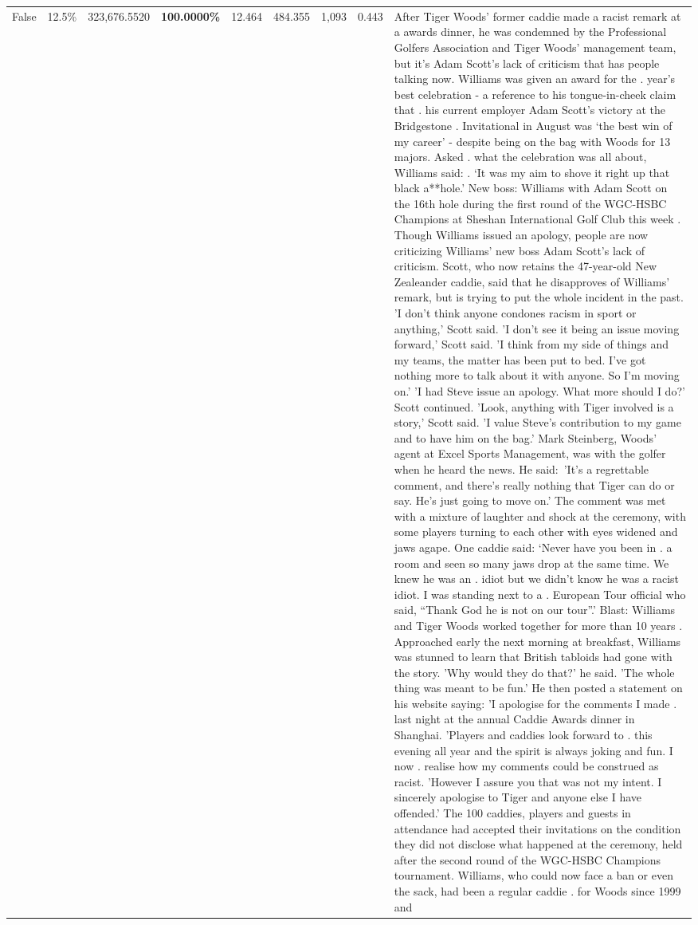 \begin{table}[H]
\begin{tabular}{lllrlllll}
False & 12.5\% & 323,676.5520 & \bfseries \color{red} 100.0000\% & 12.464 & 484.355 & 1,093 & 0.443 & After Tiger Woods' former caddie made a racist remark at a awards dinner, he was condemned by the Professional Golfers Association and Tiger Woods' management team, but it's Adam Scott's lack of criticism that has people talking now. Williams was given an award for the . year’s best celebration - a reference to his tongue-in-cheek claim that . his current employer Adam Scott’s victory at the Bridgestone . Invitational in August was ‘the best win of my career’ - despite being on the bag with Woods for 13 majors. Asked . what the celebration was all about, Williams said: . ‘It was my aim to shove it right up that black a**hole.’ New boss: Williams with Adam Scott  on the 16th hole during the first round of the WGC-HSBC Champions at Sheshan International Golf Club this week . Though Williams issued an apology, people are now criticizing Williams' new boss Adam Scott's lack of criticism. Scott, who now retains the 47-year-old New Zealeander caddie, said that he disapproves of Williams' remark, but is trying to put the whole incident in the past. 'I don't think anyone condones racism in sport or anything,' Scott said. 'I don't see it being an issue moving forward,' Scott said. 'I think from my side of things and my teams, the matter has been put to bed. I've got nothing more to talk about it with anyone. So I'm moving on.' 'I had Steve issue an apology. What more should I do?' Scott continued. 'Look, anything with Tiger involved is a story,' Scott said. 'I value Steve's contribution to my game and to have him on the bag.' Mark Steinberg, Woods' agent at Excel Sports Management, was with the golfer when he heard the news. He said: 'It's a regrettable comment, and there's really nothing that Tiger can do or say. He's just going to move on.' The comment was met with a mixture of laughter and shock at the ceremony, with some players turning to each other with eyes widened and jaws agape. One caddie said: ‘Never have you been in . a room and seen so many jaws drop at the same time. We knew he was an . idiot but we didn’t know he was a racist idiot. I was standing next to a . European Tour official who said, “Thank God he is not on our tour”.’ Blast: Williams and Tiger Woods worked together for more than 10 years . Approached early the next morning at breakfast, Williams was stunned to learn that British tabloids had gone with the story. 'Why would they do that?' he said. 'The whole thing was meant to be fun.' He then posted a statement on his website saying: 'I apologise for the comments I made . last night at the annual Caddie Awards dinner in Shanghai. 'Players and caddies look forward to . this evening all year and the spirit is always joking and fun. I now . realise how my comments could be construed as racist. 'However I assure you that was not my intent. I sincerely apologise to Tiger and anyone else I have offended.' The 100 caddies, players and guests in attendance had accepted their invitations on the condition they did not disclose what happened at the ceremony, held after the second round of the WGC-HSBC Champions tournament. Williams, who could now face a ban or even the sack, had been a regular caddie . for Woods since 1999 and 
\end{tabular}
\end{table}
